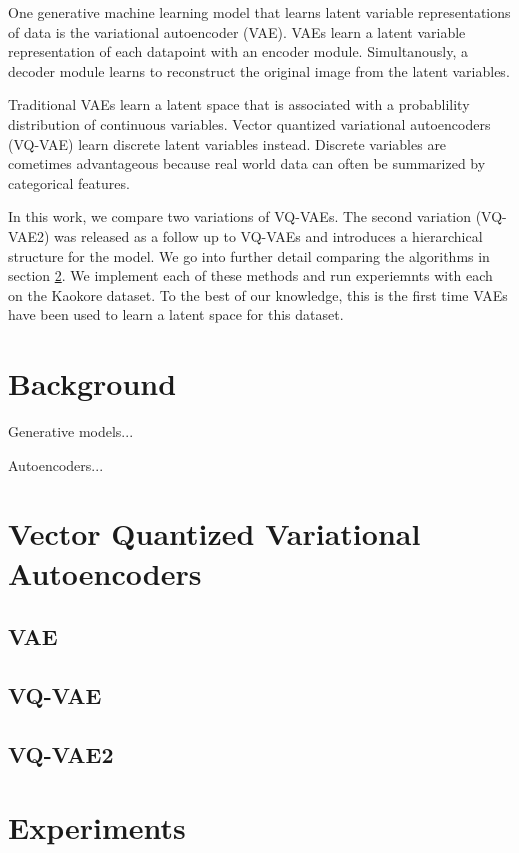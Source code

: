 \documentclass{article}
\begin{document}
One generative machine learning model that learns latent variable representations of data is the variational autoencoder (VAE). VAEs learn a latent variable representation of each datapoint with an encoder module. Simultanously, a decoder module learns to reconstruct the original image from the latent variables.

Traditional VAEs learn a latent space that is associated with a probablility distribution of continuous variables. Vector quantized variational autoencoders (VQ-VAE) learn discrete latent variables instead. Discrete variables are cometimes advantageous because real world data can often be summarized by categorical features. 

In this work, we compare two variations of VQ-VAEs. The second variation (VQ-VAE2) was released as a follow up to VQ-VAEs and introduces a hierarchical structure for the model. We go into further detail comparing the algorithms in section \ref{vqvae}. We implement each of these methods and run experiemnts with each on the Kaokore dataset. To the best of our knowledge, this is the first time VAEs have been used to learn a latent space for this dataset.

\section{Background}

Generative models...

Autoencoders...

\section{Vector Quantized Variational Autoencoders} \label{vqvae}

\subsection{VAE}
\subsection{VQ-VAE}
\subsection{VQ-VAE2}

\section{Experiments}
\end{document}
